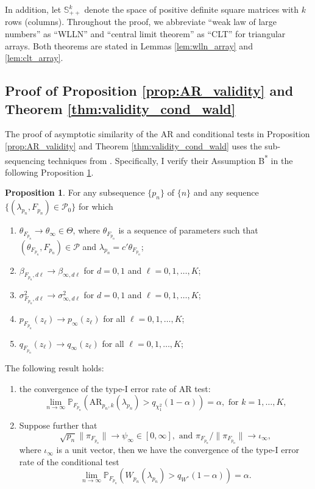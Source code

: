\documentclass[11pt]{article}
\theoremstyle{definition}
\newtheorem{proposition}{Proposition}[section]
\newcommand{\Prob}{\ensuremath{\mathbb{P}}} %
\newcommand{\0}{\ensuremath{\mathbf{0}}}
\begin{document}
\begin{bibunit}
In addition, let $\mathbb{S}_{++}^{k}$ denote the space of positive definite square matrices with $k$ rows (columns). Throughout the proof, we abbreviate ``weak law of large numbers'' as ``WLLN'' and ``central limit theorem'' as ``CLT'' for triangular arrays. Both theorems are stated in Lemmas \ref{lem:wlln_array} and \ref{lem:clt_array}.


\subsection{Proof of Proposition \ref{prop:AR_validity} and Theorem \ref{thm:validity_cond_wald}}
The proof of asymptotic similarity of the AR and conditional tests in Proposition \ref{prop:AR_validity} and Theorem \ref{thm:validity_cond_wald} uses the sub-sequencing techniques from \cite{andrews/cheng/guggenberger:2020}. Specifically, I verify their Assumption B\textsuperscript{*} in the following Proposition \ref{prop:subsequence_AR_validity}. 

%
\begin{proposition}
\label{prop:subsequence_AR_validity}
For any subsequence $\{p_n\}$ of $\{n\}$ and any sequence $\{(\lambda_{p_n}, F_{p_n}) \in \mathcal{P}_0\}$ for which 
\begin{enumerate}
	\item $\theta_{F_{p_n}} \to \theta_\infty \in \Theta$, where $\theta_{F_{p_n}}$ is a sequence of parameters such that $(\theta_{F_{p_n}}, F_{p_n}) \in \mathcal{P}$ and $\lambda_{{p_n}} = c'\theta_{F_{p_n}}$;
	\item $\beta_{F_{p_n}, d\ell} \to \beta_{\infty,d\ell}$ for $d = 0,1$ and $\ell = 0,1,\ldots,K$;
	\item $\sigma^2_{F_{p_n}, d\ell} \to \sigma^2_{\infty, d\ell}$ for $d = 0,1$ and $\ell = 0,1,\ldots,K$;
	\item $p_{F_{p_n}}(z_\ell) \to p_\infty(z_\ell)$ for all $\ell = 0,1,\ldots,K$;
	\item $q_{F_{p_n}}(z_\ell) \to q_{\infty}(z_\ell)$ for all $\ell = 0,1,\ldots,K$;
\end{enumerate}
The following result holds:
\begin{enumerate}
\item[(a)] the convergence of the type-I error rate of AR test:
\begin{equation*}
    \lim_{n\to\infty} \Prob_{F_{p_n}}\left(\text{AR}_{p_n,k}(\lambda_{p_n}) > q_{\chi_1^2}(1-\alpha)\right) = \alpha, \text{ for } k = 1,\ldots,K,
\end{equation*}
\item[(b)] 
Suppose further that 
\[
    \sqrt{p_n}\|\pi_{F_{p_n}}\| \to \psi_\infty\in [0,\infty], \text{~and~} \pi_{F_{p_n}}/\|\pi_{F_{p_n}}\| \to \iota_\infty,
\] %
where $\iota_\infty$ is a unit vector, then we have the convergence of the type-I error rate of the conditional test
\begin{equation*}
    \lim_{n\to\infty} \Prob_{F_{p_n}}\left(W_{p_n}(\lambda_{p_n}) > q_{W^*}(1-\alpha)\right) = \alpha.
\end{equation*}
\end{enumerate}
\end{proposition}


\end{bibunit}
\end{document}
